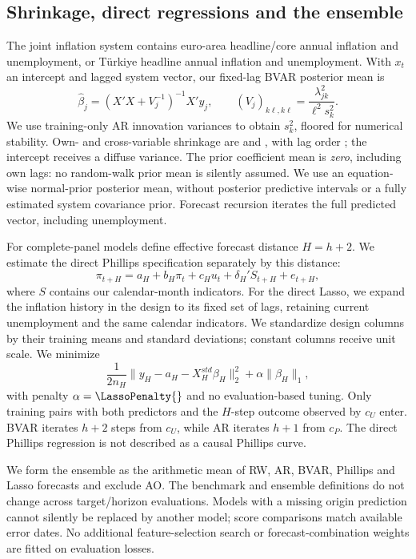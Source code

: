 \subsection{Shrinkage, direct regressions and the ensemble}
The joint inflation system contains euro-area headline/core annual inflation and unemployment, or Türkiye headline annual inflation and unemployment. With $x_t$ an intercept and lagged system vector, our fixed-lag BVAR posterior mean is
\begin{equation}
 \widehat\beta_j=(X'X+V_j^{-1})^{-1}X'y_j,
 \qquad (V_j)_{k\ell, k\ell}=\frac{\lambda_{jk}^{2}}{\ell^{2}s_k^{2}}.
\end{equation}
We use training-only AR innovation variances to obtain $s_k^2$, floored for numerical stability. Own- and cross-variable shrinkage are \OwnShrink{} and \CrossShrink{}, with lag order \BVARLag{}; the intercept receives a diffuse variance. The prior coefficient mean is \emph{zero}, including own lags: no random-walk prior mean is silently assumed. We use an equation-wise normal-prior posterior mean, without posterior predictive intervals or a fully estimated system covariance prior. Forecast recursion iterates the full predicted vector, including unemployment.

For complete-panel models define effective forecast distance $H=h+2$. We estimate the direct Phillips specification separately by this distance:
\begin{equation}
 \pi_{t+H}=a_H+b_H\pi_t+c_Hu_t+\delta_H'S_{t+H}+e_{t+H},
\end{equation}
where $S$ contains our calendar-month indicators. For the direct Lasso, we expand the inflation history in the design to its fixed set of lags, retaining current unemployment and the same calendar indicators. We standardize design columns by their training means and standard deviations; constant columns receive unit scale. We minimize
\begin{equation}
 \frac{1}{2n_H}\|y_H-a_H-X_H^{std}\beta_H\|_2^2+\alpha\|\beta_H\|_1,
\end{equation}
with penalty $\alpha=\LassoPenalty{}$ and no evaluation-based tuning. Only training pairs with both predictors and the $H$-step outcome observed by $c_U$ enter. BVAR iterates $h+2$ steps from $c_U$, while AR iterates $h+1$ from $c_P$. The direct Phillips regression is not described as a causal Phillips curve.

We form the ensemble as the arithmetic mean of RW, AR, BVAR, Phillips and Lasso forecasts and exclude AO. The benchmark and ensemble definitions do not change across target/horizon evaluations. Models with a missing origin prediction cannot silently be replaced by another model; score comparisons match available error dates. No additional feature-selection search or forecast-combination weights are fitted on evaluation losses.
